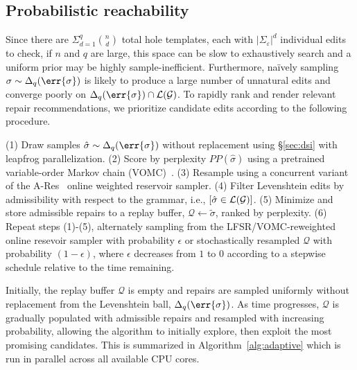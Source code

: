 \documentclass[runningheads]{llncs}
\begin{document}
\subsection{Probabilistic reachability}\label{sec:adaptive}

Since there are $\Sigma_{d=1}^q{n \choose d}$ total hole templates, each with $|\Sigma_\varepsilon| ^d$ individual edits to check, if $n$ and $q$ are large, this space can be slow to exhaustively search and a uniform prior may be highly sample-inefficient. Furthermore, na\"ively sampling $\sigma\sim\Delta_{q}(\err{\sigma})$ is likely to produce a large number of unnatural edits and converge poorly on $\Delta_{q}(\err{\sigma})\cap\mathcal{L}(\mathcal{G})$. To rapidly rank and render relevant repair recommendations, we prioritize candidate edits according to the following procedure.

(1) Draw samples $\hat\sigma \sim \Delta_q(\err{\sigma})$ without replacement using \S\ref{sec:dsi} with leapfrog parallelization. (2) Score by perplexity $PP(\hat\sigma)$ using a pretrained variable-order Markov chain (VOMC)~\cite{schulz2008vomc}. (3) Resample using a concurrent variant of the A-Res~\cite{efraimidis2015weighted} online weighted reservoir sampler. (4) Filter Levenshtein edits by admissibility with respect to the grammar, i.e., $[\hat\sigma \in \mathcal{L}\vspace{2pt}(\mathcal{G})]$.
(5) Minimize and store admissible repairs to a replay buffer, $\mathcal{Q} \leftarrow \tilde\sigma$, ranked by perplexity. (6) Repeat steps (1)-(5), alternately sampling from the LFSR/VOMC-reweighted online resevoir sampler with probability $\epsilon$ or stochastically resampled $\mathcal{Q}$ with probability $(1-\epsilon)$, where $\epsilon$ decreases from $1$ to $0$ according to a stepwise schedule relative to the time remaining.

Initially, the replay buffer $\mathcal{Q}$ is empty and repairs are sampled uniformly without replacement from the Levenshtein ball, $\Delta_{q}(\err{\sigma})$. As time progresses, $\mathcal{Q}$  is gradually populated with admissible repairs and resampled with increasing probability, allowing the algorithm to initially explore, then exploit the most promising candidates. This is summarized in Algorithm~\ref{alg:adaptive} which is run in parallel across all available CPU cores.

\begin{figure}[H]
  \vspace{-10pt}
    \begin{minipage}{\textwidth}
      
    \end{minipage}
\end{figure}
\end{document}
